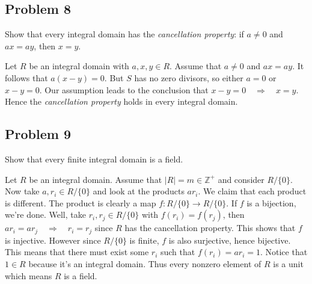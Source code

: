 \documentclass[../hw_sols.tex]{subfiles}
\begin{document}
\newpage



\subsection*{Problem 8}

Show that every integral domain has the \textit{cancellation property}: if 
$a \neq 0$ and $ax = ay$, then $x = y$.

\begin{solution}
Let $R$ be an integral domain with $a,x,y \in R$. Assume that $a \neq 0$ and 
$ax = ay$. It follows that $a(x - y) = 0$. But $S$ has no zero divisors, so 
either $a = 0$ or $x - y = 0$. Our assumption leads to the conclusion that 
$x - y = 0 \quad \Rightarrow \quad x = y$. Hence the 
\textit{cancellation property} holds in every integral domain.
\end{solution}


\newpage



\subsection*{Problem 9}

Show that every finite integral domain is a field.

\begin{solution}
Let $R$ be an integral domain. Assume that $|R| = m \in \mathbb{Z}^+$ and 
consider $R/\{0\}$. Now take $a,r_i \in R/\{0\}$ and look at the products 
$ar_i$. We claim that each product is different. The product is clearly a map 
$f: R/\{0\} \to R/\{0\}$. If $f$ is a bijection, we're done. Well, take 
$r_i, r_j \in R/\{0\}$ with $f(r_i) = f(r_j)$, then 
$ar_i = ar_j \quad \Rightarrow \quad r_i = r_j$ since $R$ has the cancellation 
property. This shows that $f$ is injective. However since $R/\{0\}$ is finite, 
$f$ is also surjective, hence bijective. This means that there must exist some 
$r_i$ such that $f(r_i) = ar_i = 1$. Notice that $1 \in R$ because it's an 
integral domain. Thus every nonzero element of $R$ is a unit which means $R$ 
is a field.
\end{solution}
\end{document}
